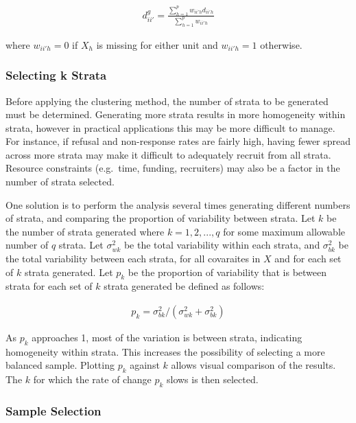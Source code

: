 \documentclass[man,floatsintext]{apa6}
\begin{document}
\begin{align}
  d^{g}_{ii'} = \frac{\sum^p_{h = 1}w_{ii'h}d_{ii'h}}{\sum^p_{h = 1}w_{ii'h}}
\end{align}

where \(w_{ii'h} = 0\) if \(X_h\) is missing for either unit and \(w_{ii'h} = 1\) otherwise.

\hypertarget{selecting-k-strata}{%
\subsubsection{Selecting k Strata}\label{selecting-k-strata}}

Before applying the clustering method, the number of strata to be generated must be determined. Generating more strata results in more homogeneity within strata, however in practical applications this may be more difficult to manage. For instance, if refusal and non-response rates are fairly high, having fewer spread across more strata may make it difficult to adequately recruit from all strata. Resource constraints (e.g.~time, funding, recruiters) may also be a factor in the number of strata selected.

One solution is to perform the analysis several times generating different numbers of strata, and comparing the proportion of variability between strata. Let \(k\) be the number of strata generated where \(k = 1, 2, ..., q\) for some maximum allowable number of \(q\) strata. Let \(\sigma_{wk}^2\) be the total variability within each strata, and \(\sigma_{bk}^2\) be the total variability between each strata, for all covaraites in \(X\) and for each set of \(k\) strata generated. Let \(p_k\) be the proportion of variability that is between strata for each set of \(k\) strata generated be defined as follows:

\begin{align} \label{eq:pk}
  p_k = \sigma_{bk}^2/(\sigma_{wk}^2 + \sigma_{bk}^2)
\end{align}

As \(p_k\) approaches 1, most of the variation is between strata, indicating homogeneity within strata. This increases the possibility of selecting a more balanced sample. Plotting \(p_k\) against \(k\) allows visual comparison of the results. The \(k\) for which the rate of change \(p_k\) slows is then selected.

\hypertarget{sample-selection}{%
\subsubsection{Sample Selection}\label{sample-selection}}
\end{document}
